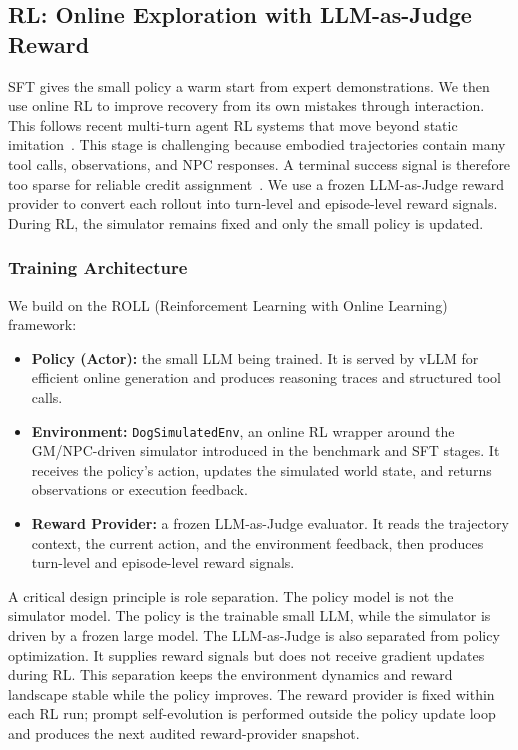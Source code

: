 
\subsection{RL: Online Exploration with LLM-as-Judge Reward}
\label{sec:rl}

SFT gives the small policy a warm start from expert demonstrations. We then use online RL to improve recovery from its own mistakes through interaction. This follows recent multi-turn agent RL systems that move beyond static imitation~\citep{zhou2024archer,wei2025webagentr1,wang2025ragen}. This stage is challenging because embodied trajectories contain many tool calls, observations, and NPC responses. A terminal success signal is therefore too sparse for reliable credit assignment~\citep{wang2025ragen}. We use a frozen LLM-as-Judge reward provider to convert each rollout into turn-level and episode-level reward signals. During RL, the simulator remains fixed and only the small policy is updated.

\subsubsection{Training Architecture}

We build on the ROLL (Reinforcement Learning with Online Learning) framework:

\begin{itemize}
    \item \textbf{Policy (Actor):} the small LLM being trained. It is served by vLLM for efficient online generation and produces reasoning traces and structured tool calls.
    \item \textbf{Environment:} \texttt{DogSimulatedEnv}, an online RL wrapper around the GM/NPC-driven simulator introduced in the benchmark and SFT stages. It receives the policy's action, updates the simulated world state, and returns observations or execution feedback.
    \item \textbf{Reward Provider:} a frozen LLM-as-Judge evaluator. It reads the trajectory context, the current action, and the environment feedback, then produces turn-level and episode-level reward signals.
\end{itemize}

A critical design principle is role separation. The policy model is not the simulator model. The policy is the trainable small LLM, while the simulator is driven by a frozen large model. The LLM-as-Judge is also separated from policy optimization. It supplies reward signals but does not receive gradient updates during RL. This separation keeps the environment dynamics and reward landscape stable while the policy improves. The reward provider is fixed within each RL run; prompt self-evolution is performed outside the policy update loop and produces the next audited reward-provider snapshot.

